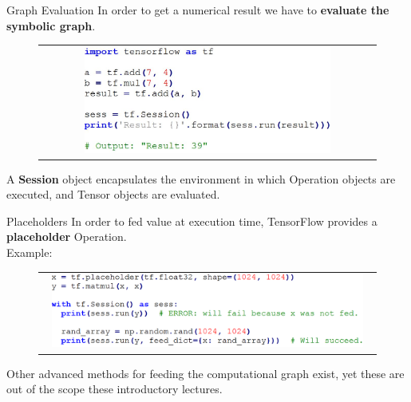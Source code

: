 \documentclass[aspectratio=169]{beamer}
\begin{document}

\begin{frame}{Graph Evaluation}
In order to get a numerical result we have to \textbf{evaluate the symbolic graph}.\\
\begin{figure}
\begin{tabular}{c}
\includegraphics[width=0.75\textwidth]{img/tf/graph_evaluation.jpg}
\end{tabular}
\end{figure}
A \textbf{Session} object encapsulates the environment in which Operation objects are executed, and Tensor objects are evaluated.
\end{frame}


\begin{frame}{Placeholders}
In order to fed value at execution time, TensorFlow provides a \textbf{placeholder} Operation.\\
\vspace{0.25cm}
Example:
\begin{figure}
\begin{tabular}{c}
\includegraphics[width=0.95\textwidth]{img/tf/placeholders.png}
\end{tabular}
\end{figure}
Other advanced methods for feeding the computational graph exist, yet these are out of the scope these introductory lectures.
\end{frame}

\end{document}
